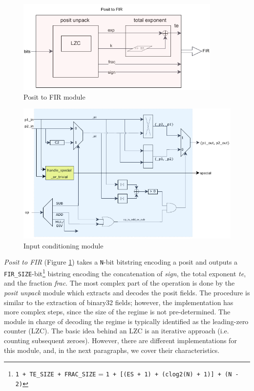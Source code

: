 \begin{figure}
    \centering
    \includegraphics[width=0.9\textwidth]{figures/posit2fir.drawio.pdf}
    \caption{Posit to FIR module}
    \label{fig:posit2fir_ppu}
\end{figure}






\begin{figure}
    \centering
    \includegraphics[width=.75\textwidth]{figures/input_conditioning.pdf}
    \caption{Input conditioning module}
    \label{fig:input_conditioning_module}
\end{figure}



\textit{Posit to FIR} (Figure \ref{fig:posit2fir_ppu}) takes a \texttt{N}-bit bitstring encoding a posit and outputs a \texttt{FIR\_SIZE}-bit\footnote{\texttt{1 + TE\_SIZE + FRAC\_SIZE} = \texttt{1 + [(ES + 1) + (clog2(N) + 1)] + (N - 2)}} bistring encoding the concatenation of \textit{sign}, the total exponent \textit{te}, and the fraction \textit{frac}.
The most complex part of the operation is done by the \textit{posit unpack} module which extracts and decodes the posit fields. The procedure is similar to the extraction of binary32 fields; however, the implementation has more complex steps, since the size of the regime is not pre-determined.
The module in charge of decoding the regime is typically identified as the leading-zero counter (LZC). The basic idea behind an LZC is an iterative approach (i.e. counting subsequent zeroes). However, there are different implementations for this module, and, in the next paragraphs, we cover their characteristics.

